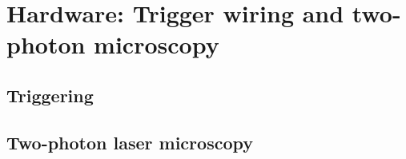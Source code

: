 \section{Hardware: Trigger wiring and two-photon microscopy}
\label{sec:sectione}

\subsection{Triggering}
\label{subsec:subasectionE}

\subsection{Two-photon laser microscopy}
\label{subsec:subbsectionE}